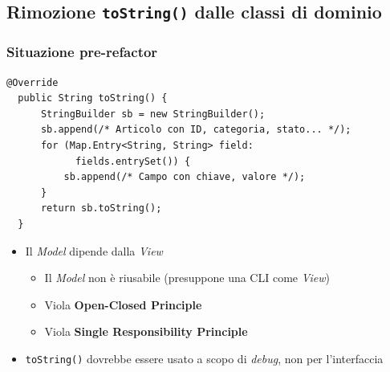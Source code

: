 

\subsection{Rimozione \texttt{toString()} dalle classi di dominio}
\begin{frame}[fragile]
  \frametitle{Situazione pre-refactor}
  \begin{lstlisting}[autogobble, title={\texttt{toString()} di \texttt{Article.java}}]
  @Override
  public String toString() {
      StringBuilder sb = new StringBuilder();
      sb.append(/* Articolo con ID, categoria, stato... */);
      for (Map.Entry<String, String> field:
            fields.entrySet()) {
          sb.append(/* Campo con chiave, valore */);
      }
      return sb.toString();
  }
  \end{lstlisting}

  \begin{itemize}
    \item Il \emph{Model} dipende dalla \emph{View}
    \begin{itemize}
      \item Il \emph{Model} non è riusabile (presuppone una CLI come \emph{View})
      \item Viola \textbf{Open-Closed Principle}
      \item Viola \textbf{Single Responsibility Principle}
    \end{itemize}
    \item \texttt{toString()} dovrebbe essere usato a scopo di \emph{debug}, non per l'interfaccia
  \end{itemize}
\end{frame}

